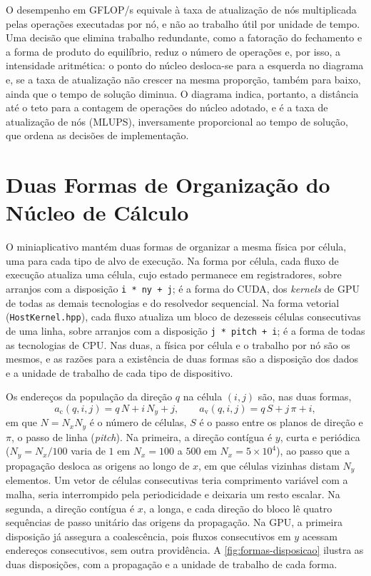 O desempenho em GFLOP/s equivale à taxa de atualização de nós multiplicada pelas operações executadas por nó, e não ao trabalho útil por unidade de tempo.
Uma decisão que elimina trabalho redundante, como a fatoração do fechamento e a forma de produto do equilíbrio, reduz o número de operações e, por isso, a intensidade aritmética: o ponto do núcleo desloca-se para a esquerda no diagrama e, se a taxa de atualização não crescer na mesma proporção, também para baixo, ainda que o tempo de solução diminua.
O diagrama indica, portanto, a distância até o teto para a contagem de operações do núcleo adotado, e é a taxa de atualização de nós (MLUPS), inversamente proporcional ao tempo de solução, que ordena as decisões de implementação.


\section{Duas Formas de Organização do Núcleo de Cálculo}\label{sec:duas-formas-de-implementacao}

O miniaplicativo mantém duas formas de organizar a mesma física por célula, uma para cada tipo de alvo de execução.
Na forma por célula, cada fluxo de execução atualiza uma célula, cujo estado permanece em registradores, sobre arranjos com a disposição \texttt{i * ny + j}; é a forma do CUDA, dos \textit{kernels} de GPU de todas as demais tecnologias e do resolvedor sequencial.
Na forma vetorial (\texttt{HostKernel.hpp}), cada fluxo atualiza um bloco de dezesseis células consecutivas de uma linha, sobre arranjos com a disposição \texttt{j * pitch + i}; é a forma de todas as tecnologias de CPU.
Nas duas, a física por célula e o trabalho por nó são os mesmos, e as razões para a existência de duas formas são a disposição dos dados e a unidade de trabalho de cada tipo de dispositivo.

Os endereços da população da direção $q$ na célula $(i, j)$ são, nas duas formas,
\begin{equation}
    a_{\mathrm{c}}(q, i, j) = q\, N + i\, N_y + j,
    \qquad
    a_{\mathrm{v}}(q, i, j) = q\, S + j\, \pi + i,
    \label{eq:enderecos-disposicoes}
\end{equation}
em que $N = N_x N_y$ é o número de células, $S$ é o passo entre os planos de direção e $\pi$, o passo de linha (\textit{pitch}).
Na primeira, a direção contígua é $y$, curta e periódica ($N_y = N_x/100$ varia de $1$ em $N_x = 100$ a $500$ em $N_x = 5 \times 10^4$), ao passo que a propagação desloca as origens ao longo de $x$, em que células vizinhas distam $N_y$ elementos.
Um vetor de células consecutivas teria comprimento variável com a malha, seria interrompido pela periodicidade e deixaria um resto escalar.
Na segunda, a direção contígua é $x$, a longa, e cada direção do bloco lê quatro sequências de passo unitário das origens da propagação.
Na GPU, a primeira disposição já assegura a coalescência, pois fluxos consecutivos em $y$ acessam endereços consecutivos, sem outra providência.
A \autoref{fig:formas-disposicao} ilustra as duas disposições, com a propagação e a unidade de trabalho de cada forma. %

